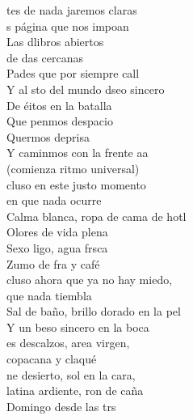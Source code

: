 \documentclass[12pt]{article}
\begin{document}
\begin{multicols*}{2}
        \begin{cancion}%
                tes de nada jaremos claras\\
                s página que nos impoan\\
                Las dlibros abiertos \\
                de das cercanas\\
                Pades que por siempre call\\
                Y al sto del mundo dseo sincero\\
                De éitos en la batalla \\
                Que penmos despacio\\
                Quermos deprisa\\
                Y caminmos con la frente aa\\
        (comienza ritmo universal)\\
        \jump
                cluso en este justo momento \\
        en que nada ocurre\\
                Calma blanca, ropa de cama de hotl\\
        Olores de vida plena\\
                Sexo ligo, agua frsca\\
                Zumo de fra y café\\
        \jump
                cluso ahora que ya no hay miedo, \\
        que nada tiembla\\
                Sal de baño, brillo dorado en la pel\\
        Y un beso sincero en la boca\\
                es descalzos, area virgen, \\
                copacana y claqué\\
        \jump
                ne desierto, sol en la cara, \\
        latina ardiente, ron de caña\\
                Domingo desde las trs\\

\end{cancion}
\end{multicols*}
\end{document}

